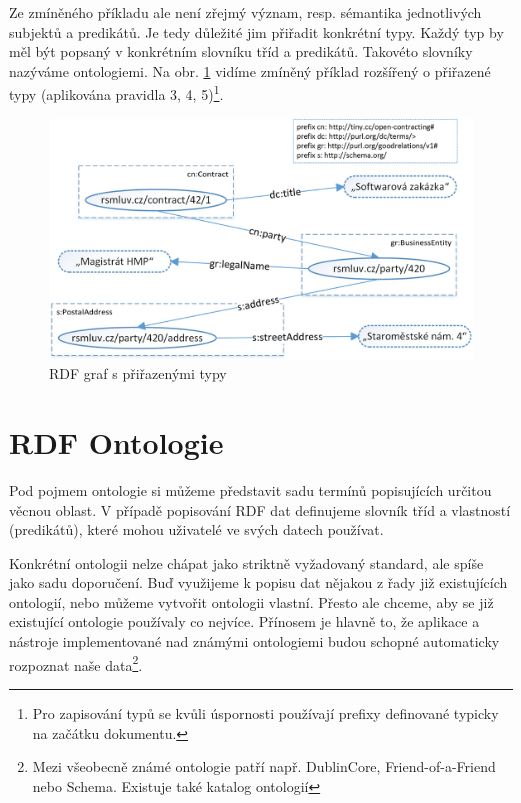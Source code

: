 Ze zmíněného příkladu ale není zřejmý význam, resp. sémantika jednotlivých subjektů a predikátů. Je tedy důležité jim přiřadit konkrétní typy. Každý typ by měl být popsaný v konkrétním slovníku tříd a predikátů. Takovéto slovníky nazýváme ontologiemi. Na obr. \ref{obr:rdf_graphWithOntology} vidíme zmíněný příklad rozšířený o přiřazené typy (aplikována pravidla 3, 4, 5)\footnote{Pro zapisování typů se kvůli úspornosti používají prefixy definované typicky na začátku dokumentu.}.

\begin{figure}[h]
\centerline{\includegraphics[width=\textwidth]{img/rdf_graphWithOntology.eps}}
\caption{RDF graf s přiřazenými typy}
\label{obr:rdf_graphWithOntology}
\end{figure}

\newpage

\section{RDF Ontologie}

Pod pojmem ontologie si můžeme představit sadu termínů popisujících určitou věcnou oblast. V případě popisování RDF dat definujeme slovník tříd a vlastností (predikátů), které mohou uživatelé ve svých datech používat.

Konkrétní ontologii nelze chápat jako striktně vyžadovaný standard, ale spíše jako sadu doporučení. Buď využijeme k popisu dat nějakou z řady již existujících ontologií, nebo můžeme vytvořit ontologii vlastní. Přesto ale chceme, aby se již existující ontologie používaly co nejvíce. Přínosem je hlavně to, že aplikace a nástroje implementované nad známými ontologiemi budou schopné automaticky rozpoznat naše data\footnote{Mezi všeobecně známé ontologie patří např. DublinCore\cite{dc}, Friend-of-a-Friend\cite{foaf} nebo Schema\cite{schema}. Existuje také katalog ontologií\cite{lov}}. 

